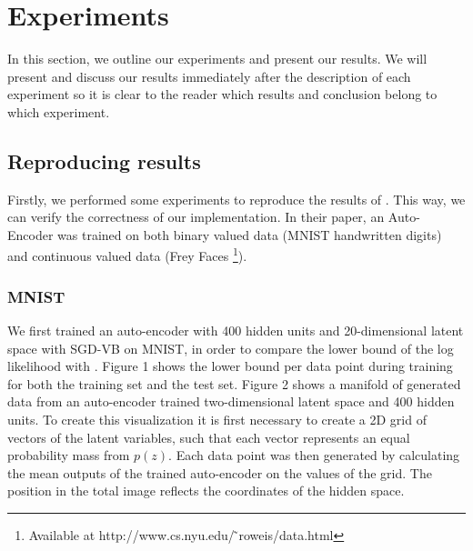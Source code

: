 \documentclass{article}
\begin{document}
\section{Experiments}

In this section, we outline our experiments and present our results. We will present and discuss our results immediately after the description of each experiment so it is clear to the reader which results and conclusion belong to which experiment.

\subsection{Reproducing results}

Firstly, we performed some experiments to reproduce the results of \cite{kingma2013auto}. This way, we can verify the correctness of our implementation. In their paper, an Auto-Encoder was trained on both binary valued data (MNIST handwritten digits) and continuous valued data (Frey Faces \footnote{Available at http://www.cs.nyu.edu/ ̃roweis/data.html}).

\subsubsection{MNIST}

We first trained an auto-encoder with 400 hidden units and 20-dimensional latent space with SGD-VB on MNIST, in order to compare the lower bound of the log likelihood with \cite{kingma2013auto}. Figure 1 shows the lower bound per data point during training for both the training set and the test set. Figure 2 shows a manifold of generated data from an auto-encoder trained two-dimensional latent space and 400 hidden units. To create this visualization it is first necessary to create a 2D grid of vectors of the latent variables, such that each vector represents an equal probability mass from $p(z)$. Each data point was then generated by calculating the mean outputs of the trained auto-encoder on the values of the grid. The position in the total image reflects the coordinates of the hidden space. \\ 
\end{document}
